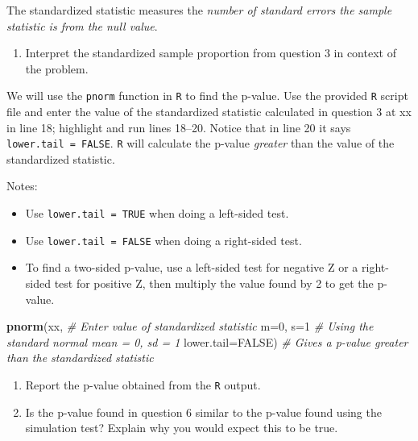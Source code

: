 \documentclass[
]{report}
\newenvironment{Shaded}{\begin{snugshade}}{\end{snugshade}}
\newcommand{\CommentTok}[1]{\textcolor[rgb]{0.56,0.35,0.01}{\textit{#1}}}
\newcommand{\DataTypeTok}[1]{\textcolor[rgb]{0.13,0.29,0.53}{#1}}
\newcommand{\DecValTok}[1]{\textcolor[rgb]{0.00,0.00,0.81}{#1}}
\newcommand{\KeywordTok}[1]{\textcolor[rgb]{0.13,0.29,0.53}{\textbf{#1}}}
\newcommand{\NormalTok}[1]{#1}
\newcommand{\OtherTok}[1]{\textcolor[rgb]{0.56,0.35,0.01}{#1}}
\providecommand{\tightlist}{%
  \setlength{\itemsep}{0pt}\setlength{\parskip}{0pt}}
\begin{document}
\vspace{0.2in}

The standardized statistic measures the \emph{number of standard errors the sample statistic is from the null value}.

\begin{enumerate}
\def\labelenumi{\arabic{enumi}.}
\setcounter{enumi}{4}
\tightlist
\item
  Interpret the standardized sample proportion from question 3 in context of the problem.
\end{enumerate}

\vspace{1in}

We will use the \texttt{pnorm} function in \texttt{R} to find the p-value. Use the provided \texttt{R} script file and enter the value of the standardized statistic calculated in question 3 at xx in line 18; highlight and run lines 18--20. Notice that in line 20 it says \texttt{lower.tail\ =\ FALSE}. \texttt{R} will calculate the p-value \emph{greater} than the value of the standardized statistic.

Notes:

\begin{itemize}
\tightlist
\item
  Use \texttt{lower.tail\ =\ TRUE} when doing a left-sided test.
\item
  Use \texttt{lower.tail\ =\ FALSE} when doing a right-sided test.
\item
  To find a two-sided p-value, use a left-sided test for negative Z or a right-sided test for positive Z, then multiply the value found by 2 to get the p-value.
\end{itemize}

\begin{Shaded}
\begin{Highlighting}[]
\KeywordTok{pnorm}\NormalTok{(xx, }\CommentTok{\# Enter value of standardized statistic}
      \DataTypeTok{m=}\DecValTok{0}\NormalTok{, }\DataTypeTok{s=}\DecValTok{1} \CommentTok{\# Using the standard normal mean = 0, sd = 1}
      \DataTypeTok{lower.tail=}\OtherTok{FALSE}\NormalTok{) }\CommentTok{\# Gives a p{-}value greater than the standardized statistic}
\end{Highlighting}
\end{Shaded}

\begin{enumerate}
\def\labelenumi{\arabic{enumi}.}
\setcounter{enumi}{5}
\item
  Report the p-value obtained from the \texttt{R} output.
  \vspace{0.2in}
\item
  Is the p-value found in question 6 similar to the p-value found using the simulation test? Explain why you would expect this to be true.
\end{enumerate}
\end{document}
